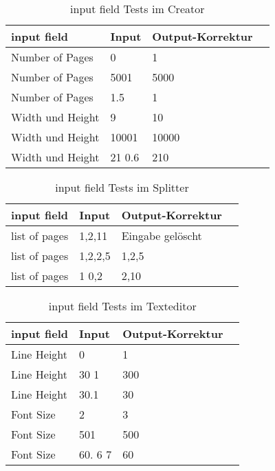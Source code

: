 \begin{table}[!htbp]
	\centering
	\begin{tabular}{|p{4cm}|p{3cm}|p{3cm}|p{3cm}|}
		\hline
		\textbf{input field}		& \textbf{Input} 	& \textbf{Output-Korrektur}	\\ 
		\hline
		Number of Pages 			& 0 				& 1 						\\ 
		Number of Pages				& 5001 				& 5000  					\\ 
		Number of Pages				& 1.5 				& 1  						\\ 
		Width und Height			& 9 				& 10						\\  
		Width und Height			& 10001 			& 10000 					\\  
		Width und Height			& 21 0.6			& 210	 					\\
		\hline
	\end{tabular}
	\caption{input field Tests im Creator}
	\label{table:creator-input}
\end{table}

\begin{table}[!htbp]
	\centering
	\begin{tabular}{|p{4cm}|p{3cm}|p{3cm}|p{3cm}|}
		\hline
		\textbf{input field}	& \textbf{Input} 	& \textbf{Output-Korrektur}		\\ 
		\hline
		list of pages			& 1,2,11			& Eingabe gelöscht  			\\ 
		list of pages			& 1,2,2,5			& 1,2,5 						\\ 
		list of pages			& 1 0,2				& 2,10							\\ 
		\hline
	\end{tabular}
	\caption{input field Tests im Splitter}
	\label{table:splitter-input}
\end{table}

\begin{table}[!htbp]
	\centering
	\begin{tabular}{|p{4cm}|p{3cm}|p{3cm}|p{3cm}|}
		\hline
		\textbf{input field}			& \textbf{Input} 			& \textbf{Output-Korrektur}		\\ 
		\hline
		Line Height 					& 0 						& 1  							\\
		Line Height						& 30 1 						& 300 							\\ 
		Line Height						& 30.1 						& 30							\\ 
		Font Size 						& 2							& 3  							\\
		Font Size						& 501						& 500 							\\ 
		Font Size						& 60. 6 7					& 60 							\\ 
		\hline
	\end{tabular}
	\caption{input field Tests im Texteditor}
	\label{table:text-input}
\end{table}

